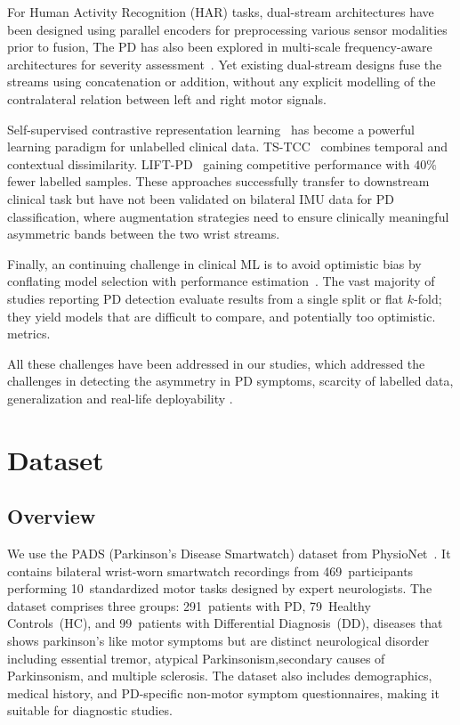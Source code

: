 \documentclass[pmlr]{jmlr}
\begin{document}
For Human Activity Recognition (HAR) tasks, dual-stream architectures have been designed using parallel encoders for preprocessing various sensor modalities prior to fusion, The PD has also been explored in multi-scale frequency-aware architectures for severity assessment~\citep{zhao2025mfam}. Yet existing dual-stream designs fuse the streams using concatenation or addition, without any explicit modelling of the contralateral relation between left and right motor signals.


Self-supervised contrastive representation learning~\citep{oord2018} has become a powerful learning paradigm for unlabelled clinical data. TS-TCC~\citep{eldele2021} combines temporal and contextual dissimilarity. LIFT-PD~\citep{soumma2025liftpd} gaining competitive performance with $40\%$ fewer labelled samples. These approaches successfully transfer to downstream clinical task but have not been validated on bilateral IMU data for PD classification, where augmentation strategies need to ensure clinically meaningful asymmetric bands between the two wrist streams.


Finally, an continuing challenge in clinical ML is to avoid optimistic bias by conflating model selection with performance estimation~\citep{varma2006}. The vast majority of studies reporting PD detection evaluate results from a single split or flat $k$-fold; they yield models that are difficult to compare, and potentially too optimistic.
metrics.

All these challenges have been addressed in our studies, which addressed the challenges in detecting the asymmetry in PD symptoms, scarcity of labelled data, generalization and real-life deployability .




\section{Dataset}
\label{sec:dataset}

\subsection{Overview}




We use the PADS (Parkinson's Disease Smartwatch) dataset from
PhysioNet~\citep{varghese2024}. It contains bilateral wrist-worn smartwatch recordings from
469~participants performing 10~standardized motor tasks designed by expert neurologists. 
The dataset comprises three groups: 291~patients with PD, 79~Healthy Controls~(HC), and 99~patients with Differential Diagnosis~(DD), diseases that shows parkinson's like motor symptoms but are distinct neurological disorder including essential tremor, atypical Parkinsonism,secondary causes of Parkinsonism, and multiple sclerosis.
The dataset also includes demographics, medical history, and PD-specific non-motor symptom questionnaires, making it suitable for diagnostic studies.
\end{document}
